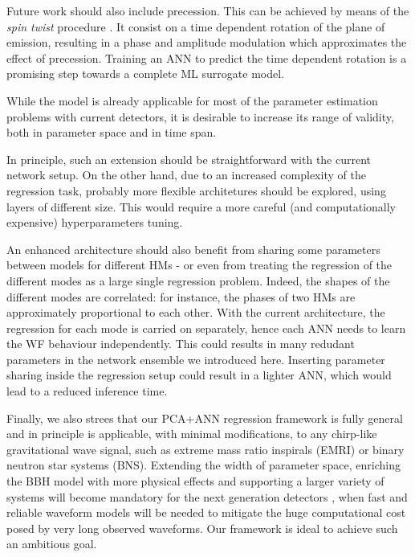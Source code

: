 \documentclass[twocolumn,showpacs,preprintnumbers,nofootinbib,prd,
superscriptaddress,10pt]{revtex4-2}
\begin{document}
Future work should also include precession. This can be achieved by means of the {\it spin twist} procedure \cite{Schmidt:2012rh, Schmidt:2014iyl, Pratten:2020ceb, Gamba:2021ydi}. It consist on a time dependent rotation of the plane of emission, resulting in a phase and amplitude modulation which approximates the effect of precession.
Training an ANN to predict the time dependent rotation is a promising step towards a complete ML surrogate model.

While the model is already applicable for most of the parameter estimation problems with current detectors, 
it is desirable to increase its range of validity, both in parameter space and in time span.

In principle, such an extension should be straightforward with the current network setup. On the other hand, due to an increased complexity of the regression task, probably more flexible architetures should be explored, using layers of different size. This would require a more careful (and computationally expensive) hyperparameters tuning.

An enhanced architecture should also benefit from sharing some parameters between models for different HMs - or even from treating the regression of the different modes as a large single regression problem. Indeed, the shapes of the different modes are correlated: for instance, the phases of two HMs are approximately proportional to each other. 
With the current architecture, the regression for each mode is carried on separately, hence each ANN needs to learn the WF behaviour independently. 
This could results in many redudant parameters in the network ensemble we introduced here.
Inserting parameter sharing inside the regression setup could result in a lighter ANN, which would lead to a reduced inference time.

Finally, we also strees that our PCA+ANN regression framework is fully general and in principle is applicable, with minimal modifications, to any chirp-like gravitational wave signal, such as extreme mass ratio inspirals (EMRI) \cite{Amaro-Seoane:2007osp, Amaro-Seoane:2012lgq} or binary neutron star systems (BNS).
Extending the width of parameter space, enriching the BBH model with more physical effects and supporting a larger variety of systems will become mandatory for the next generation detectors \cite{Purrer:2019jcp, Owen:2023mid}, when fast and reliable waveform models will be needed to mitigate the huge computational cost posed by very long observed waveforms.
Our framework is ideal to achieve such an ambitious goal.
\end{document}
